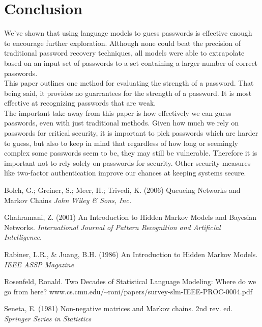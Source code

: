 \documentclass{amsart}
\theoremstyle{definition}
\theoremstyle{remark}
\numberwithin{equation}{section}
\begin{document}
\section{Conclusion}
We've shown that using language models to guess passwords is effective enough to encourage further exploration. Although none could beat the precision of traditional password recovery techniques, all models were able to extrapolate based on an input set of passwords to a set containing a larger number of correct passwords.\\
This paper outlines one method for evaluating the strength of a password. That being said, it provides no guarrantees for the strength of a password. It is most effective at recognizing passwords that are weak.\\
The important take-away from this paper is how effectively we can guess passwords, even with just traditional methods. Given how much we rely on passwords for critical security, it is important to pick passwords which are harder to guess, but also to keep in mind that regardless of how long or seemingly complex some passwords seem to be, they may still be vulnerable. Therefore it is important not to rely solely on passwords for security. Other security measures like two-factor authentication improve our chances at keeping systems secure.\\

\newpage

\begin{thebibliography}{9}
Bolch, G.; Greiner, S.; Meer, H.; Trivedi, K. (2006) Queueing Networks and Markov Chains
\textit{John Wiley \& Sons, Inc.}

Ghahramani, Z. (2001) An Introduction to Hidden Markov Models and Bayesian Networks.
\textit{International Journal of Pattern Recognition and Artificial Intelligence.}

Rabiner, L.R., \& Juang, B.H. (1986) An Introduction to Hidden Markov Models.
\textit{IEEE ASSP Magazine}

Rosenfeld, Ronald. Two Decades of Statistical Language Modeling: Where do we go from here?
www.cs.cmu.edu/\textasciitilde{}roni/papers/survey-slm-IEEE-PROC-0004.pdf

Seneta, E. (1981) Non-negative matrices and Markov chains. 2nd rev. ed.
\textit{Springer Series in Statistics}

\end{thebibliography}
\end{document}
